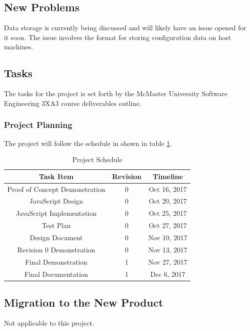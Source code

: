 \documentclass[12pt, titlepage]{article}
\begin{document}
\subsection{New Problems}
Data storage is currently being discussed and will likely have an issue opened for it soon. The issue involves the format for storing configuration data on host machines.
\subsection{Tasks}
The tasks for the project is set forth by the McMaster University Software Engineering 3XA3 course deliverables outline.\\

\subsubsection{Project Planning}
The project will follow the schedule in shown in table \ref{table:projsched}.
	\begin{table}[h]
		\begin{center}
	\begin{tabular}{||c c c||} 
		\hline
		Task Item & Revision & Timeline \\ [0.5ex] 
		\hline\hline
		Proof of Concept Demonstration & 0 & Oct 16, 2017 \\ 
		\hline
		JavaScript Design &  0 & Oct 20, 2017 \\
		\hline
		JavaScript Implementation &  0 & Oct 25, 2017 \\
		\hline
		Test Plan & 0 & Oct 27, 2017 \\
		\hline
		Design Document &  0 & Nov 10, 2017 \\
		\hline
		Revision 0 Demonstration & 0 & Nov 13, 2017 \\
		\hline
		Final Demonstration & 1 & Nov 27, 2017 \\
		\hline
		Final Documentation & 1 & Dec 6, 2017  \\ [1ex] 
		\hline
	\end{tabular}
	\caption{Project Schedule}
	\label{table:projsched}
\end{center}
	\end{table}


\subsection{Migration to the New Product}
Not applicable to this project.
\end{document}
